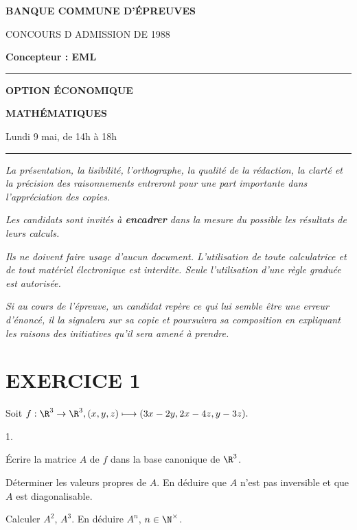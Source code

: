 \documentclass[11pt]{article}%
\begin{document}

\begin{center}
{\LARG\E\textbf{BANQUE COMMUNE D'ÉPREUVES}}



{\large \textsc{CONCOURS D ADMISSION DE 1988}}



{\large \textbf{Concepteur : EML}}



\rule{2.39cm}{0.05cm}



{\Large \textbf{OPTION ÉCONOMIQUE}}



{\Large \textbf{MATHÉMATIQUES }}



{\Large Lundi 9 mai, de 14h à 18h}



\rule{2.39cm}{0.05cm}
\end{center}

\textit{La présentation, la lisibilité, l'orthographe, la qualité
de la rédaction, la clarté et la précision des raisonnements
entreront pour une part importante dans l'appréciation des copies.}

\textit{Les candidats sont invités à \textbf{encadrer} dans la mesure
du possible les résultats de leurs calculs.}

\textit{Ils ne doivent faire usage d'aucun document. L'utilisation de
toute
calculatrice et de tout matériel électronique est interdite. Seule
l'utilisation d'une règle graduée est autorisée.}

\textit{Si au cours de l'épreuve, un candidat repère ce qui lui semble
être une erreur d'énoncé, il la signalera sur sa copie et
poursuivra sa composition en expliquant les raisons des initiatives
qu'il sera
amené à prendre.}

\vspace*{3cm}

\section*{EXERCICE 1}

Soit $f :\R^{3}\rightarrow \R^{3},(x,y,z)\longmapsto
(3x-2y,2x-4z,y-3z).$

\begin{noliste}{1.}
 \setlength{\itemsep}{4mm}
\item Écrire la matrice $A$ de $f$ dans la base canonique de $\R^{3}$.

\item Déterminer les valeurs propres de $A$. En déduire que $A$ n'est
pas
inversible et que $A$ est diagonalisable.

\item Calculer $A^{2}$, $A^{3}$. En déduire $A^{n}$, $n\in \N^{\times
}$.
\end{noliste}
\end{document}
